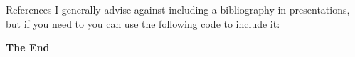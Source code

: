 \documentclass[aspectratio=169,xcolor=dvipsnames]{beamer}
\begin{document}

\begin{frame}{References}
    I generally advise against including a bibliography in presentations, but if you need to you can use the following code to include it:
    \footnotesize
    
    
\end{frame}


\begin{frame}
    \Huge{\centerline{\textbf{The End}}}
\end{frame}

\end{document}
